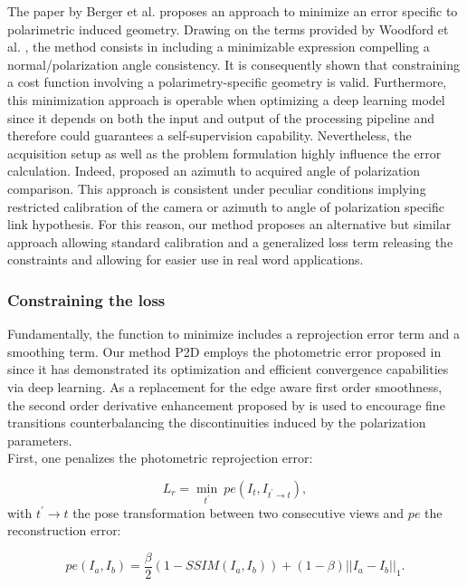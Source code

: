 The paper by Berger et al. \cite{berger2017depth} proposes an approach to minimize an error specific to polarimetric induced geometry. Drawing on the terms provided by Woodford et al. \cite{Woodford2008GlobalPriors}, the method consists in including a minimizable expression compelling a normal/polarization angle consistency.
It is consequently shown that constraining a cost function involving a polarimetry-specific geometry is valid. Furthermore, this minimization approach is operable when optimizing a deep learning model since it depends on both the input and output of the processing pipeline and therefore could guarantees a self-supervision capability. Nevertheless, the acquisition setup as well as the problem formulation highly influence the error calculation. Indeed, \cite{berger2017depth} proposed an azimuth to acquired angle of polarization comparison. This approach is consistent under peculiar conditions implying restricted calibration of the camera or azimuth to angle of polarization specific link hypothesis. For this reason, our method proposes an alternative but similar approach allowing standard calibration and a generalized loss term releasing the constraints and allowing for easier use in real word applications.


\subsubsection{Constraining the loss}

Fundamentally, the function to minimize includes a reprojection error term and a smoothing term. Our method P2D employs the photometric error proposed in~\cite{godard2019digging} since it has demonstrated its optimization and efficient convergence capabilities via deep learning. As a replacement for the edge aware first order smoothness, the second order derivative enhancement proposed by \cite{Woodford2008GlobalPriors} is used to encourage fine transitions counterbalancing the discontinuities induced by the polarization parameters.\\ 
First, one penalizes the photometric reprojection error:

\begin{equation}
L_r = \min_{t^\prime} \: pe(I_t, I_{t^\prime \rightarrow t}),
\end{equation}
with $t^\prime \rightarrow t$ the pose transformation between two consecutive views and $pe$ the reconstruction error:

\begin{equation}
pe(I_a, I_b) = \frac{\beta}{2} (1- SSIM(I_a, I_b)) + (1-\beta) ||I_a - I_b||_1.
\end{equation}


